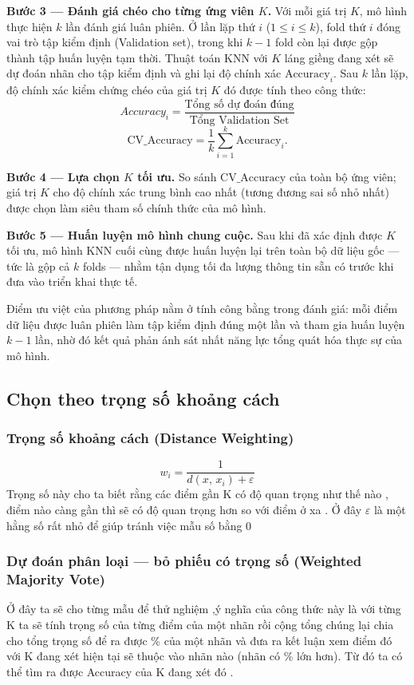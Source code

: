 \documentclass[12pt,a4paper]{article}
\begin{document}
\textbf{Bước 3 — Đánh giá chéo cho từng ứng viên $K$.} Với mỗi giá trị
$K$, mô hình thực hiện $k$ lần đánh giá luân phiên. Ở lần lặp thứ $i$
($1 \le i \le k$), fold thứ $i$ đóng vai trò tập kiểm định (Validation
set), trong khi $k - 1$ fold còn lại được gộp thành tập huấn luyện tạm
thời. Thuật toán KNN với $K$ láng giềng đang xét sẽ dự đoán nhãn cho
tập kiểm định và ghi lại độ chính xác $\mathrm{Accuracy}_i$. Sau $k$
lần lặp, độ chính xác kiểm chứng chéo của giá trị $K$ đó được tính theo
công thức:
\begin{equation}
    Accuracy_i=\frac{\text{Tổng số dự đoán đúng}}{\text{Tổng Validation Set}}
\end{equation}
\begin{equation}
    \mathrm{CV\_Accuracy} = \frac{1}{k} \sum_{i=1}^{k} \mathrm{Accuracy}_i.
\end{equation}

\textbf{Bước 4 — Lựa chọn $K$ tối ưu.} So sánh $\mathrm{CV\_Accuracy}$
của toàn bộ ứng viên; giá trị $K$ cho độ chính xác trung bình cao nhất
(tương đương sai số nhỏ nhất) được chọn làm siêu tham số chính thức của
mô hình.

\textbf{Bước 5 — Huấn luyện mô hình chung cuộc.} Sau khi đã xác định
được $K$ tối ưu, mô hình KNN cuối cùng được huấn luyện lại trên toàn bộ
dữ liệu gốc — tức là gộp cả $k$ folds — nhằm tận dụng tối đa lượng
thông tin sẵn có trước khi đưa vào triển khai thực tế.

Điểm ưu việt của phương pháp nằm ở tính công bằng trong đánh giá: mỗi
điểm dữ liệu được luân phiên làm tập kiểm định đúng một lần và tham gia
huấn luyện $k - 1$ lần, nhờ đó kết quả phản ánh sát nhất năng lực tổng
quát hóa thực sự của mô hình.
\subsection{Chọn theo trọng số khoảng cách }
\subsubsection{Trọng số khoảng cách (Distance Weighting)}
\begin{equation}
    w_i = \frac{1}{d(x,\, x_i) + \varepsilon}
\end{equation} 
Trọng số này cho ta biết rằng các điểm gần K có độ quan trọng như thế nào , điểm nào càng gần thì sẽ có độ quan trọng hơn so với điểm ở xa . Ở đây $\varepsilon$ là một hằng số rất nhỏ để giúp tránh việc mẫu số bằng 0 
\subsubsection{Dự đoán phân loại — bỏ phiếu có trọng số (Weighted Majority Vote)}
Ở đây ta sẽ cho từng mẫu để thử nghiệm ,ý nghĩa của công thức này là với từng K ta sẽ tính trọng số của từng điểm của một nhãn rồi cộng tổng chúng lại chia cho tổng trọng số để ra được \% của một nhãn và đưa ra kết luận xem điểm đó với K đang xét hiện tại sẽ thuộc vào nhãn nào (nhãn có \% lớn hơn). Từ đó ta có thể tìm ra được Accuracy của K đang xét đó .
\end{document}
